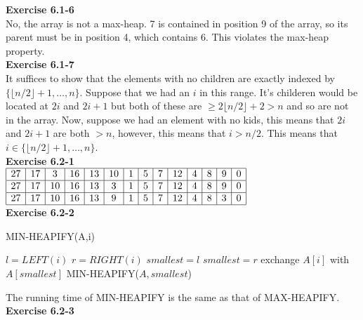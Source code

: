 \documentclass{article}
\begin{document}
\noindent\textbf{Exercise 6.1-6}\\

No, the array is not a max-heap.  7 is contained in position 9 of the array, so its parent must be in position 4, which contains 6.  This violates the max-heap property. \\

\noindent\textbf{Exercise 6.1-7}\\

It suffices to show that the elements with no children are exactly indexed by $\{\lfloor n/2\rfloor+1, \ldots, n\}$. Suppose that we had an $i$ in this range. It's childeren would be located at $2i$ and $2i+1$ but both of these are $\ge 2 \lfloor n/2\rfloor +2 > n$ and so are not in the array. Now, suppose we had an element with no kids, this means that $2i$ and $2i+1$ are both $>n$, however, this means that $i > n/2$. This means that $i\in \{\lfloor n/2\rfloor+1, \ldots, n\}$.\\

\noindent\textbf{Exercise 6.2-1}\\

$
\begin{array}{|c|c|c|c|c|c|c|c|c|c|c|c|c|c|}
\hline
27&17&3&16&13&10&1&5&7&12&4&8&9&0\\
\hline
27&17&10&16&13&3&1&5&7&12&4&8&9&0\\
\hline
27&17&10&16&13&9&1&5&7&12&4&8&3&0\\
\hline
\end{array}
$\\

\noindent\textbf{Exercise 6.2-2}\\

\begin{algorithm}
\caption{MIN-HEAPIFY(A,i)}
\begin{algorithmic}[1]
\State $l=LEFT(i)$ 
\State $r=RIGHT(i)$
	\State $smallest = l$
\EndIf
{}
	\State $smallest = r$
\EndIf
{}
	\State exchange $A[i]$ with $A[smallest]$
	\State MIN-HEAPIFY($A, smallest$)
\EndIf
\end{algorithmic}
\end{algorithm}

The running time of MIN-HEAPIFY is the same as that of MAX-HEAPIFY. \\


\noindent\textbf{Exercise 6.2-3}\\
\end{document}
